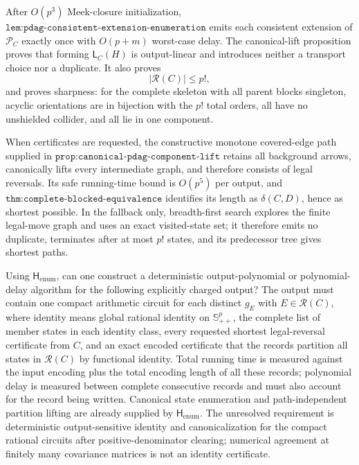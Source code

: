 After \(O(p^3)\) Meek-closure initialization, \(\texttt{lem:pdag-consistent-extension-enumeration}\) emits each consistent extension of \(\mathcal P_C\) exactly once with \(O(p+m)\) worst-case delay. The canonical-lift proposition proves that forming \(\mathsf L_C(H)\) is output-linear and introduces neither a transport choice nor a duplicate. It also proves
\[
 |\mathcal R(C)|\leq p!,
\]
and proves sharpness: for the complete skeleton with all parent blocks singleton, acyclic orientations are in bijection with the \(p!\) total orders, all have no unshielded collider, and all lie in one component.

When certificates are requested, the constructive monotone covered-edge path supplied in \(\texttt{prop:canonical-pdag-component-lift}\) retains all background arrows, canonically lifts every intermediate graph, and therefore consists of legal reversals. Its safe running-time bound is \(O(p^5)\) per output, and \(\texttt{thm:complete-blocked-equivalence}\) identifies its length as \(\delta(C,D)\), hence as shortest possible. In the fallback only, breadth-first search explores the finite legal-move graph and uses an exact visited-state set; it therefore emits no duplicate, terminates after at most \(p!\) states, and its predecessor tree gives shortest paths.

Using \(\mathsf H_{\mathrm{enum}}\), can one construct a deterministic output-polynomial or polynomial-delay algorithm for the following explicitly charged output? The output must contain one compact arithmetic circuit for each distinct \(g_E\) with \(E\in\mathcal R(C)\), where identity means global rational identity on \(\mathbb S^p_{++}\), the complete list of member states in each identity class, every requested shortest legal-reversal certificate from \(C\), and an exact encoded certificate that the records partition all states in \(\mathcal R(C)\) by functional identity. Total running time is measured against the input encoding plus the total encoding length of all these records; polynomial delay is measured between complete consecutive records and must also account for the record being written. Canonical state enumeration and path-independent partition lifting are already supplied by \(\mathsf H_{\mathrm{enum}}\). The unresolved requirement is deterministic output-sensitive identity and canonicalization for the compact rational circuits after positive-denominator clearing; numerical agreement at finitely many covariance matrices is not an identity certificate.

